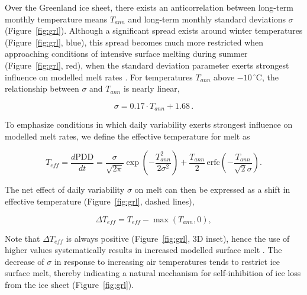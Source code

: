 \documentclass[review]{igs}
\begin{document}
Over the Greenland ice sheet, there exists an anticorrelation between long-term monthly temperature means $T_{ann}$ and long-term monthly standard deviations $\sigma$ (Figure~\ref{fig:grl}). Although a significant spread exists around winter temperatures (Figure~\ref{fig:grl}, blue), this spread becomes much more restricted when approaching conditions of intensive surface melting during summer (Figure~\ref{fig:grl}, red), when the standard deviation parameter exerts strongest influence on modelled melt rates \citep{rogozhina-rau-inpress}. For temperatures $T_{ann}$ above $-10\,^\circ$C, the relationship between $\sigma$ and $T_{ann}$ is nearly linear,

\begin{equation} \label{eq:sigma}
    \sigma = 0.17 \cdot T_{ann} + 1.68\,.
\end{equation}

To emphasize conditions in which daily variability exerts strongest influence on modelled melt rates, we define the effective temperature for melt as

\begin{equation} \label{eq:teff}
    T_{eff} = \frac{d\mathrm{PDD}}{dt}
        = \frac{\sigma}{\sqrt{2\pi}} \exp\left({-\frac{T_{ann}^2}{2\sigma^2}}\right)
            + \frac{T_{ann}}{2} \, \mathrm{erfc} \left(-\frac{T_{ann}}{\sqrt{2}\sigma}\right).
\end{equation}

The net effect of daily variability $\sigma$ on melt can then be expressed as a shift in effective temperature (Figure~\ref{fig:grl}, dashed lines),

\begin{equation} \label{eq:dteff}
    \Delta T_{eff} = T_{eff} - \max(T_{ann}, 0),
\end{equation}

Note that $\Delta T_{eff}$ is always positive (Figure~\ref{fig:grl}, 3D inset), hence the use of higher values systematically results in increased modelled surface melt \citep{rogozhina-rau-inpress}. The decrease of $\sigma$ in response to increasing air temperatures tends to restrict ice surface melt, thereby indicating a natural mechanism for self-inhibition of ice loss from the ice sheet (Figure~\ref{fig:grl}).
\end{document}
